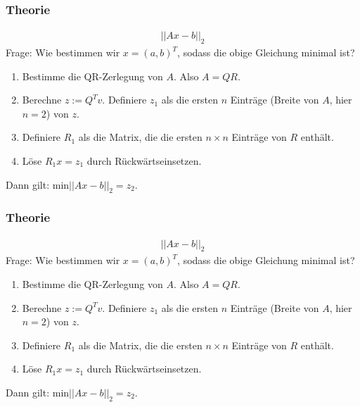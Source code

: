 \documentclass{beamer}
\begin{document}
\begin{frame}
    \frametitle{Theorie}
    \begin{align*}
        ||Ax - b||_2
    \end{align*}
    Frage: Wie bestimmen wir \(x = (a, b)^T\), sodass die obige Gleichung minimal ist?
    \begin{enumerate}
        \item Bestimme die QR-Zerlegung von \(A\). Also \(A = QR\).
        \item {\color{white}Berechne \(z := Q^T v\). Definiere \(z_1\) als die ersten \(n\) Einträge (Breite von \(A\), hier \(n = 2\)) von \(z\).}
        \item {\color{white}Definiere \(R_1\) als die Matrix, die die ersten \(n \times n\) Einträge von \(R\) enthält.}
        \item {\color{white}Löse \(R_1 x = z_1\) durch Rückwärtseinsetzen.}
    \end{enumerate}
    {\color{white}Dann gilt: \(\text{min}||Ax - b||_2 = z_2\).}
\end{frame}

\begin{frame}
    \frametitle{Theorie}
    \begin{align*}
        ||Ax - b||_2
    \end{align*}
    Frage: Wie bestimmen wir \(x = (a, b)^T\), sodass die obige Gleichung minimal ist?
    \begin{enumerate}
        \item Bestimme die QR-Zerlegung von \(A\). Also \(A = QR\).
        \item Berechne \(z := Q^T v\). Definiere \(z_1\) als die ersten \(n\) Einträge (Breite von \(A\), hier \(n = 2\)) von \(z\).
        \item {\color{white}Definiere \(R_1\) als die Matrix, die die ersten \(n \times n\) Einträge von \(R\) enthält.}
        \item {\color{white}Löse \(R_1 x = z_1\) durch Rückwärtseinsetzen.}
    \end{enumerate}
    {\color{white}Dann gilt: \(\text{min}||Ax - b||_2 = z_2\).}
\end{frame}
\end{document}
